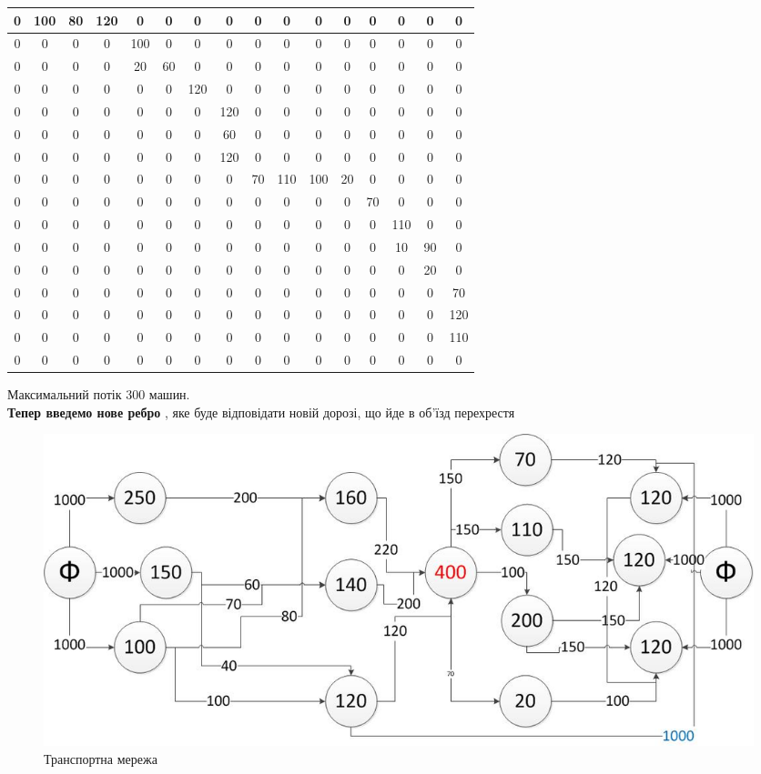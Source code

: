 \documentclass[a4paper,14pt,russian,ukrainian,oneside,final]{extreport}
\begin{document}
\begin{center}
\begin{tabular}{|c|c|c|c|c|c|c|c|c|c|c|c|c|c|c|c|}
\hline
0&100&80&120&0&0&0&0&0&0&0&0&0&0&0&0 \\ \hline
0&0&0&0&100&0&0&0&0&0&0&0&0&0&0&0 \\ \hline
0&0&0&0&20&60&0&0&0&0&0&0&0&0&0&0 \\ \hline
0&0&0&0&0&0&120&0&0&0&0&0&0&0&0&0 \\ \hline
0&0&0&0&0&0&0&120&0&0&0&0&0&0&0&0 \\ \hline
0&0&0&0&0&0&0&60&0&0&0&0&0&0&0&0 \\ \hline
0&0&0&0&0&0&0&120&0&0&0&0&0&0&0&0 \\ \hline
0&0&0&0&0&0&0&0&70&110&100&20&0&0&0&0 \\ \hline
0&0&0&0&0&0&0&0&0&0&0&0&70&0&0&0 \\ \hline
0&0&0&0&0&0&0&0&0&0&0&0&0&110&0&0 \\ \hline
0&0&0&0&0&0&0&0&0&0&0&0&0&10&90&0 \\ \hline
0&0&0&0&0&0&0&0&0&0&0&0&0&0&20&0 \\ \hline
0&0&0&0&0&0&0&0&0&0&0&0&0&0&0&70 \\ \hline
0&0&0&0&0&0&0&0&0&0&0&0&0&0&0&120 \\ \hline
0&0&0&0&0&0&0&0&0&0&0&0&0&0&0&110 \\ \hline
0&0&0&0&0&0&0&0&0&0&0&0&0&0&0&0 \\
\hline
\end{tabular}
\end{center}
Максимальний потік 300 машин.\\
{\bf Тепер введемо нове ребро }, яке буде відповідати новій дорозі, що йде в об'їзд перехрестя
\begin{figure}[h]
\begin{center}
\includegraphics[scale=0.6]{p3n.jpg}
\caption{Транспортна мережа}
\end{center}
\end{figure}
\end{document}

